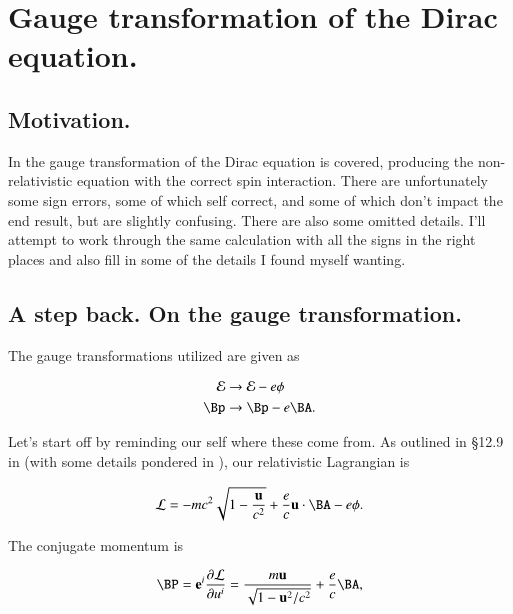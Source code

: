 %
%

\chapter{Gauge transformation of the Dirac equation.}
\label{chap:diracGauge}
{}
\date{Aug 4, 2011}

\beginArtWithToc

\section{Motivation.}

In \cite{desai2009quantum} the gauge transformation of the Dirac equation is covered, producing the non-relativistic equation with the correct spin interaction.  There are unfortunately some sign errors, some of which self correct, and some of which don't impact the end result, but are slightly confusing.  There are also some omitted details.  I'll attempt to work through the same calculation with all the signs in the right places and also fill in some of the details I found myself wanting.

\section{A step back.  On the gauge transformation.}

The gauge transformations utilized are given as

\begin{align}\label{eqn:diracGauge:10}
\mathcal{E} &\rightarrow \mathcal{E} - e \phi \\
\Bp &\rightarrow \Bp - e \BA.
\end{align}

Let's start off by reminding our self where these come from.  As outlined in \S 12.9 in \cite{jackson1975cew} (with some details pondered in \cite{miscphysics:hamiltonian}), our relativistic Lagrangian is

\begin{equation}\label{eqn:diracGauge:30}
\LL = -m c^2 \sqrt{ 1 - \frac{\Bu}{c^2}} + \frac{e}{c} \Bu \cdot \BA - e \phi.
\end{equation}

The conjugate momentum is

\begin{equation}\label{eqn:diracGauge:50}
\BP = \Be^i \PD{u^i}{\LL} = \frac{m \Bu}{\sqrt{1 - \Bu^2/c^2}} + \frac{e}{c} \BA,
\end{equation}

